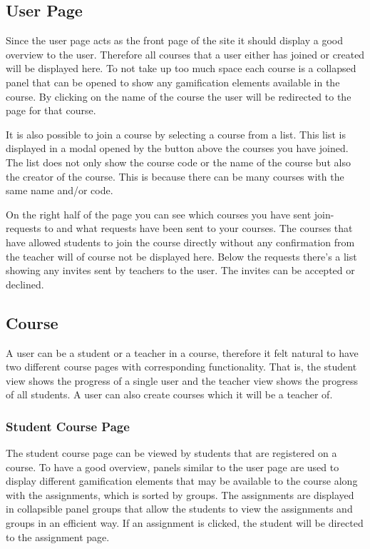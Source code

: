 \subsection{User Page}
Since the user page acts as the front page of the site it should display a good overview to the user. Therefore all courses that a user either has joined or created will be displayed here. To not take up too much space each course is a collapsed panel that can be opened to show any gamification elements available in the course. By clicking on the name of the course the user will be redirected to the page for that course.

It is also possible to join a course by selecting a course from a list. This list is displayed in a modal opened by the button above the courses you have joined.  The list does not only show the course code or the name of the course but also the creator of the course. This is because there can be many courses with the same name and/or code.

On the right half of the page you can see which courses you have sent join-requests to and what requests have been sent to your courses. The courses that have allowed students to join the course directly without any confirmation from the teacher will of course not be displayed here. Below the requests there's a list showing any invites sent by teachers to the user. The invites can be accepted or declined.

\subsection{Course}
A user can be a student or a teacher in a course, therefore it felt natural to have two different course pages with corresponding functionality. That is, the student view shows the progress of a single user and the teacher view shows the progress of all students. A user can also create courses which it will be a teacher of. 

\subsubsection{Student Course Page}
The student course page can be viewed by students that are registered on a course. To have a good overview, panels similar to the user page are used to display different gamification elements that may be available to the course along with the assignments, which is sorted by groups. The assignments are displayed in collapsible panel groups that allow the students to view the assignments and groups in an efficient way. If an assignment is clicked, the student will be directed to the assignment page. 

